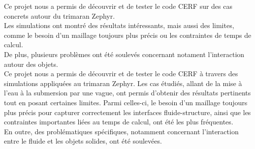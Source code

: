 \documentclass[../main.tex]{subfiles}
\begin{document}
Ce projet nous a permis de découvrir et de tester le code CERF sur des cas concrets autour du trimaran Zephyr.\\
Les simulations ont montré des résultats intéressants, mais aussi des limites, comme le besoin d'un maillage toujours plus précis ou les contraintes de temps de calcul.\\
De plus, plusieurs problèmes ont été soulevés concernant notament l'interaction autour des objets.\\

Ce projet nous a permis de découvrir et de tester le code CERF à travers des simulations appliquées au trimaran Zephyr. Les cas étudiés, allant de la mise à l'eau à la submersion par une vague, ont permis d'obtenir des résultats pertinents tout en posant certaines limites. Parmi celles-ci, le besoin d'un maillage toujours plus précis pour capturer correctement les interfaces fluide-structure, ainsi que les contraintes importantes liées au temps de calcul, ont été les plus fréquentes.\\

En outre, des problématiques spécifiques, notamment concernant l'interaction entre le fluide et les objets solides, ont été soulevées.
\end{document}
